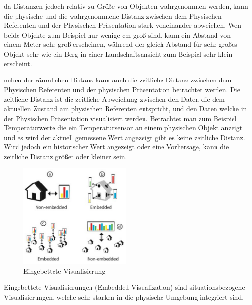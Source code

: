 \cite[S.~194]{ElSayedNevenA.M.BruceH.ThomasRossT.Smith2015} da Distanzen jedoch relativ zu Größe von Objekten wahrgenommen werden, kann die physische und die wahrgenommene Distanz zwischen dem Physischen Referenten und der Physischen Präsentation stark voneinander abweichen. Wen beide Objekte zum Beispiel nur wenige cm groß sind, kann ein Abstand von einem Meter sehr groß erscheinen, während der gleich Abstand für sehr großes Objekt sehr wie  ein Berg in einer Landschaftsansicht zum Beispiel sehr klein erscheint. 

\cite{WesleyWillettYvonneJansen} neben der räumlichen Distanz kann auch die zeitliche Distanz zwischen dem Physischen Referenten und der physischen Präsentation betrachtet werden. 
Die zeitliche Distanz ist die zeitliche Abweichung zwischen den Daten die dem aktuellen Zustand am physischen Referenten entspricht, und den Daten welche in der Physischen Präsentation visualisiert werden.
Betrachtet man zum Beispiel Temperaturwerte die ein Temperatursensor an einem physischen Objekt anzeigt und es wird der aktuell gemessene Wert angezeigt gibt es keine zeitliche Distanz. Wird jedoch ein
historischer Wert angezeigt oder eine Vorhersage, kann die zeitliche Distanz größer oder kleiner sein.

\begin{figure}[H]
	\centering
	\includegraphics[width=0.5\textwidth]{resources/fundamentals/situated_visualization/embedded_visualization.png}
	\caption{Eingebettete Visualisierung \cite{example_embedded_visualization_concept}}
	\label{img:embedded_visualization}
\end{figure}

\cite[S.~195]{ElSayedNevenA.M.BruceH.ThomasRossT.Smith2015} Eingebettete Visualisierungen (Embedded Visualization) sind situationsbezogene Visualisierungen, welche sehr starken in die physische Umgebung integriert sind. 

